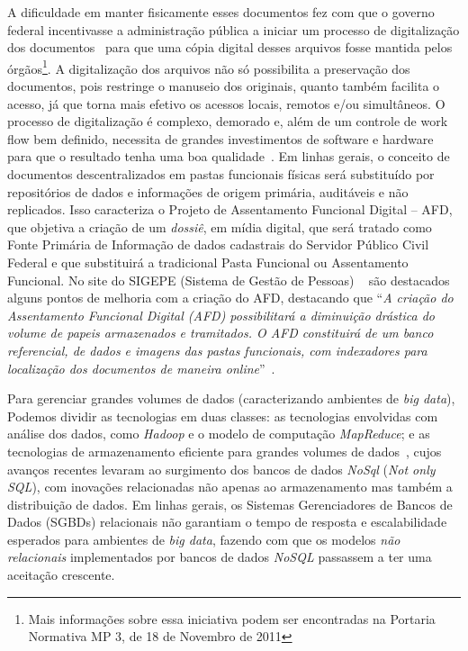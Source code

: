 A dificuldade em manter fisicamente esses documentos fez com que o governo federal incentivasse a administração pública a iniciar um processo de digitalização dos documentos~\cite{portariaMP} para que uma cópia digital desses arquivos fosse mantida pelos órgãos\footnote{Mais informa\c c\~{o}es sobre essa iniciativa podem ser encontradas na Portaria Normativa MP 3, de 18 de Novembro de 2011}. A digitalização dos arquivos não só possibilita a preservação dos documentos, pois restringe o manuseio dos originais, quanto também facilita o acesso, já que torna mais efetivo os acessos locais, remotos e/ou simultâneos. O processo de digitalização é complexo, demorado e, além de um controle de work flow bem definido, necessita de grandes investimentos de software e hardware para que o resultado tenha uma boa qualidade~\cite{arqConarq}. Em linhas gerais, o conceito de documentos descentralizados em pastas funcionais físicas será substituído por repositórios de dados e informações de origem primária, auditáveis e não replicados. Isso caracteriza o Projeto de Assentamento Funcional Digital – AFD, que objetiva a criação de um \emph{dossiê}, em mídia digital, que será tratado como Fonte Primária de Informação de dados cadastrais do Servidor Público Civil Federal e que substituirá a tradicional Pasta Funcional ou Assentamento Funcional. No site do SIGEPE (Sistema de Gestão de Pessoas) ~\cite{siteSIGEPE} são destacados alguns pontos de melhoria com a criação do AFD, destacando que ``\emph{A criação do Assentamento Funcional Digital (AFD) possibilitará a diminuição drástica do volume de papeis armazenados e tramitados. O AFD constituirá de um banco referencial, de dados e imagens das pastas funcionais, com indexadores para localização dos documentos de maneira online}''~\cite{apresentAFD}.


Para gerenciar grandes volumes de dados (caracterizando ambientes de \emph{big data}), Podemos dividir as tecnologias em duas classes: as  tecnologias envolvidas com análise dos dados, como \emph{Hadoop} e o modelo de computa\c c\~{a}o \emph{MapReduce}; e as tecnologias de armazenamento eficiente para grandes volumes de dados~\cite{ibmvcsabeoqebigdata}, cujos avanços recentes levaram ao surgimento dos bancos de dados \emph{NoSql} (\emph{Not only SQL}), com inovações relacionadas não apenas ao armazenamento mas também a distribuição de dados. Em linhas gerais, os Sistemas Gerenciadores de Bancos de Dados (SGBDs) relacionais não garantiam o tempo de resposta e escalabilidade esperados para ambientes de \emph{big data}, fazendo com que os modelos \emph{não relacionais} implementados por bancos de dados \emph{NoSQL} passassem a ter uma aceitação crescente.
 
